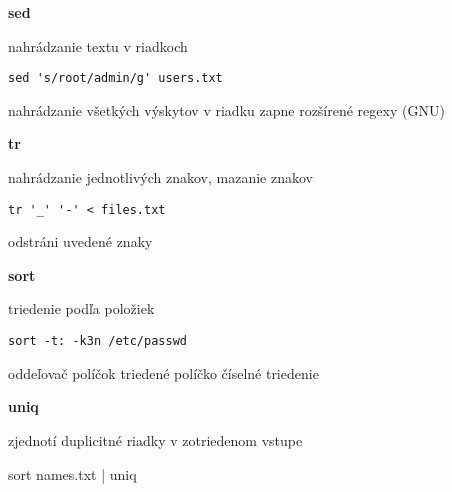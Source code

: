 \documentclass[8pt,landscape]{extarticle}
\newcommand{\Heading}[1]{%
{\begin{center}\bfseries\Large#1\end{center}}%
}%
\newcommand{\Em}[1]{\Ovalbox{#1}}
\newenvironment{karticka}[1]%
{%
\Heading{#1}%
}%
{%
\clearpage
}%
\begin{document}
\begin{karticka}{sed}
\begin{obsah}
nahrádzanie textu v riadkoch
\end{obsah}
\begin{middlecolorbox}
\begin{Verbatim}
sed 's/root/admin/g' users.txt
\end{Verbatim}
\end{middlecolorbox}
\begin{obsah}
\Em{g} nahrádzanie všetkých výskytov v riadku
\Em{-E} zapne rozšírené regexy (GNU)
\end{obsah}

\end{karticka}
\begin{karticka}{tr}
\begin{obsah}
nahrádzanie jednotlivých znakov, mazanie znakov
\end{obsah}
\begin{middlecolorbox}
\begin{Verbatim}
tr '_' '-' < files.txt
\end{Verbatim}
\end{middlecolorbox}
\begin{obsah}
\Em{-d} odstráni uvedené znaky
\end{obsah}

\end{karticka}
\begin{karticka}{sort}
\begin{obsah}
triedenie podľa položiek
\end{obsah}
\begin{middlecolorbox}
\begin{Verbatim}
sort -t: -k3n /etc/passwd
\end{Verbatim}
\end{middlecolorbox}
\begin{obsah}
\Em{-t} oddeľovač políčok
\Em{-k} triedené políčko  \Em{n} číselné triedenie
\end{obsah}

\end{karticka}
\begin{karticka}{uniq}
\begin{obsah}
zjednotí duplicitné riadky v zotriedenom vstupe
\end{obsah}
\vfill
\begin{bottomcolorbox}
sort names.txt | uniq
\end{bottomcolorbox}
\end{karticka}
\end{document}
